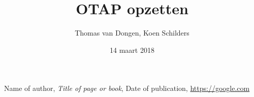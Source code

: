 \documentclass[12pt]{article}
\title{OTAP opzetten}
\author{Thomas van Dongen, Koen Schilders}
\date{14 maart 2018}
\begin{document}
\begin{titlepage}
\maketitle
\end{titlepage}

\begin{thebibliography}{9}
	Name of author,
	\textit{Title of page or book},
	Date of publication,
	\url{https://google.com}
\end{thebibliography}
\end{document}
